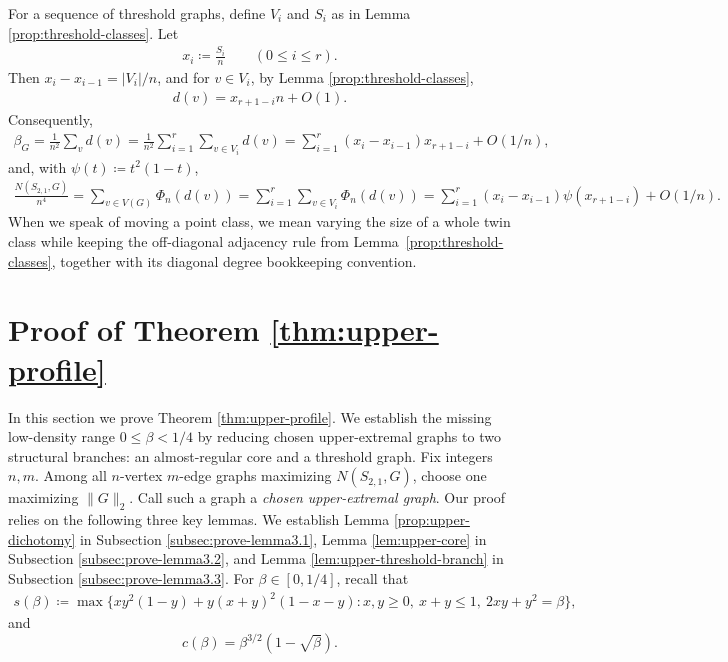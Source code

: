 \documentclass[10pt,a4paper]{article}
\newcommand{\normsq}[1]{\|#1\|_2}
\begin{document}
For a sequence of threshold graphs, define $V_i$ and  $S_i$ as in Lemma \ref{prop:threshold-classes}. Let  
\begin{align*}
  x_i\coloneqq\frac{S_i}{n}\qquad(0\le i\le r).
\end{align*}
Then $x_i-x_{i-1}=|V_i|/n$, and for $v\in V_i$, by Lemma \ref{prop:threshold-classes}, 
\begin{align}\label{eq:threshold-normal-degree}
  d(v)=x_{r+1-i}n+O(1).
\end{align}
Consequently,
\begin{align}\label{eq:threshold-beta-asymp}
  \beta_G=\frac{1}{n^2}\sum_{v}d(v)=\frac{1}{n^2}\sum_{i=1}^r\sum_{v\in V_i}d(v)=\sum_{i=1}^r (x_i-x_{i-1})x_{r+1-i}+O(1/n),
\end{align}
and, with $\psi(t)\coloneqq t^2(1-t)$,
\begin{align}\label{eq:threshold-F-asymp}
  \frac{N(S_{2,1},G)}{n^4}=\sum_{v\in V(G)} \Phi_n(d(v))=\sum_{i=1}^r\sum_{v\in V_i} \Phi_n(d(v))=\sum_{i=1}^r (x_i-x_{i-1})\psi(x_{r+1-i})+O(1/n).
\end{align}
When we speak of moving a point class, we mean varying the size of a whole twin
class while keeping the off-diagonal adjacency rule from
Lemma~\ref{prop:threshold-classes}, together with its diagonal degree
bookkeeping convention.













\section{Proof of Theorem \ref{thm:upper-profile}}\label{sec:upper}

In this section we prove Theorem \ref{thm:upper-profile}.  We establish the missing low-density range $0\le\beta<1/4$ by reducing chosen upper-extremal graphs to two structural branches: an almost-regular core and a threshold graph.  
Fix integers $n,m$.  Among all $n$-vertex $m$-edge graphs maximizing $N(S_{2,1},G)$, choose one maximizing $\normsq{G}$.  Call such a graph a \emph{chosen upper-extremal graph}. Our proof relies on the following three key lemmas. We establish Lemma \ref{prop:upper-dichotomy} in Subsection \ref{subsec:prove-lemma3.1}, Lemma \ref{lem:upper-core} in Subsection \ref{subsec:prove-lemma3.2}, and Lemma \ref{lem:upper-threshold-branch} in Subsection \ref{subsec:prove-lemma3.3}. For $\beta\in [0,1/4]$, recall that 
\begin{align*}
        s(\beta)\coloneqq
        \max\{xy^2(1-y)+y(x+y)^2(1-x-y):
        x,y\ge0,\ x+y\le1,\ 2xy+y^2=\beta\}, 
\end{align*}
and 
\[
 c(\beta)=\beta^{3/2}(1-\sqrt{\beta}). 
\]
\end{document}
